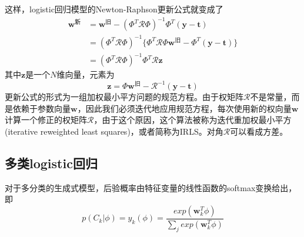 这样，logistic回归模型的Newton-Raphson更新公式就变成了
\begin{equation}
	\begin{aligned}
	\boldsymbol{w}^{\text{新}}&=\boldsymbol{w}^{\text{旧}}-(\Phi^T\mathcal{R}\Phi)^{-1}\Phi^T(\boldsymbol{y}-\boldsymbol{t})\\
	&=(\Phi^T\mathcal{R}\Phi)^{-1}\{\Phi^T\mathcal{R}\Phi\boldsymbol{w}^{\text{旧}}- \Phi^T(\boldsymbol{y}-\boldsymbol{t})\}\\
	&=(\Phi^T\mathcal{R}\Phi)^{-1}\Phi^T\mathcal{R}\boldsymbol{z}
	\end{aligned}
\end{equation}
其中$\boldsymbol{z}$是一个$N$维向量，元素为
\begin{equation}
	\boldsymbol{z}=\Phi\boldsymbol{w}^{\text{旧}}-\mathcal{R}^{-1}(\boldsymbol{y}-\boldsymbol{t})
\end{equation}
更新公式的形式为一组加权最小平方问题的规范方程。由于权矩阵$\mathcal{R}$不是常量，而是依赖于参数向量$\boldsymbol{w}$，因此我们必须迭代地应用规范方程，每次使用新的权向量$\boldsymbol{w}$计算一个修正的权矩阵$\mathcal{R}$，由于这个原因，这个算法被称为迭代重加权最小平方(iterative reweighted least squares)，或者简称为IRLS。对角$\mathcal{R}$可以看成方差。
\subsection*{多类logistic回归}
对于多分类的生成式模型，后验概率由特征变量的线性函数的softmax变换给出，即
\begin{equation}
	p(C_k|\phi)=y_k(\phi)=\frac{exp(\boldsymbol{w}_k^T\phi)}{\sum_jexp(\boldsymbol{w}_k^T\phi)}
\end{equation}
